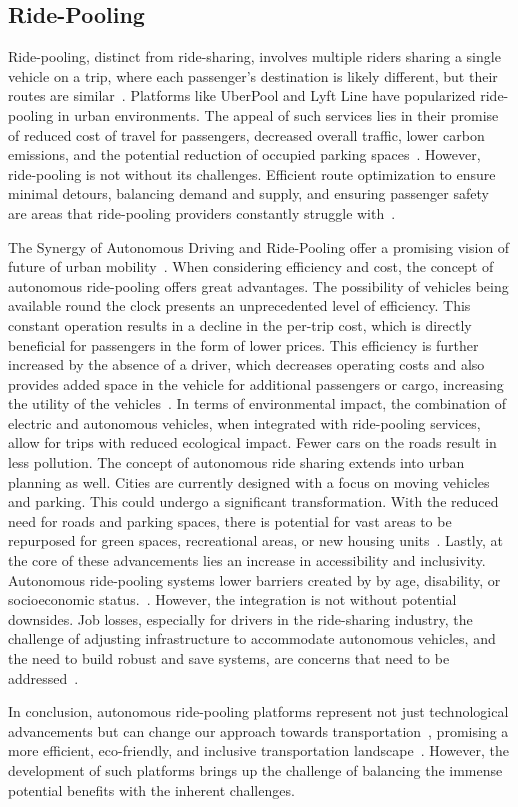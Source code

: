 \subsection{Ride-Pooling}
Ride-pooling, distinct from ride-sharing, involves multiple riders sharing a single vehicle on a trip, where each passenger's destination is likely different, but their routes are similar~\cite{Perivier.}. Platforms like UberPool and Lyft Line have popularized ride-pooling in urban environments. The appeal of such services lies in their promise of reduced cost of travel for passengers, decreased overall traffic, lower carbon emissions, and the potential reduction of occupied parking spaces~\cite{Shaheen.}.
However, ride-pooling is not without its challenges. Efficient route optimization to ensure minimal detours, balancing demand and supply, and ensuring passenger safety are areas that ride-pooling providers constantly struggle with~\cite{Perivier.}.

The Synergy of Autonomous Driving and Ride-Pooling offer a promising vision of future of urban mobility~\cite{Stamadianos.2023}.
When considering efficiency and cost, the concept of autonomous ride-pooling offers great advantages. The possibility of vehicles being available round the clock presents an unprecedented level of efficiency. This constant operation results in a decline in the per-trip cost, which is directly beneficial for passengers in the form of lower prices. This efficiency is further increased by the absence of a driver, which decreases operating costs and also provides added space in the vehicle for additional passengers or cargo, increasing the utility of the vehicles~\cite{Hacohen.2022,Stamadianos.2023}.
In terms of environmental impact, the combination of electric and autonomous vehicles, when integrated with ride-pooling services, allow  for trips with reduced ecological impact. Fewer cars on the roads result in less pollution\cite{Hacohen.2022,Stamadianos.2023}. The concept of autonomous ride sharing extends into urban planning as well.  Cities are currently designed with a focus on  moving vehicles and parking. This could undergo a significant transformation. With the reduced need for roads and parking spaces, there is potential for vast areas to be repurposed for green spaces, recreational areas, or new housing units~\cite{Stamadianos.2023}.
Lastly, at the core of these advancements lies an increase in accessibility and inclusivity.  Autonomous ride-pooling systems lower barriers created by by age, disability, or socioeconomic status.~\cite{Hacohen.2022}.
However, the integration is not without potential downsides. Job losses, especially for drivers in the ride-sharing industry, the challenge of adjusting infrastructure to accommodate autonomous vehicles, and the need to build robust and save systems, are concerns that need to be addressed~\cite{Hacohen.2022}.

In conclusion, autonomous ride-pooling platforms represent not just technological advancements but can change our approach towards transportation~\cite{Shaheen.}, promising a more efficient, eco-friendly, and inclusive transportation landscape~\cite{Stamadianos.2023}. However, the development of such platforms brings up the challenge of balancing the immense potential benefits with the inherent challenges. 
